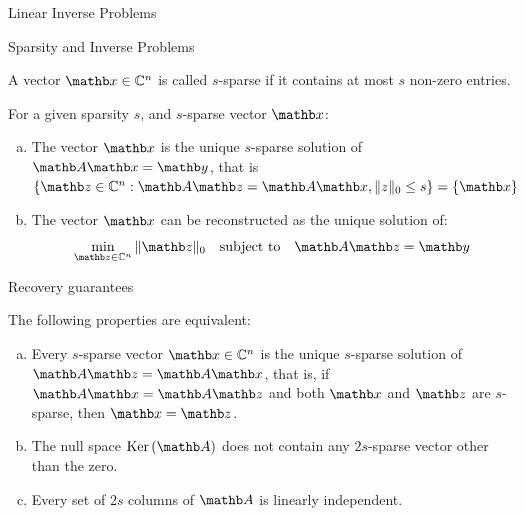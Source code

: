\begin{frame}{Linear Inverse Problems}

\end{frame}

\begin{frame}{Sparsity and Inverse Problems}
    \begin{definition}[Sparsity]
        A vector $\xb \in \mathbb{C}^n$ is called $s$-sparse if it contains at most $s$ non-zero entries.
    \end{definition}

    \begin{lemma}
        For a given sparsity $s$, and $s$-sparse vector $\xb$:
    \begin{enumerate}[(a)]
        \item The vector $\xb$ is the unique $s$-sparse solution of $\Ab \xb = \yb$, that is $\{\zb \in \mathbb{C}^n : \Ab \zb = \Ab \xb, \|z\|_0 \leq s\} = \{\xb\}$
        \item The vector $\xb$ can be reconstructed as the unique solution of:
        \begin{equation*}
            \label{eq:cs-problem-l0-min}
            \min_{\zb \in \mathbb{C}^n} \|\zb\|_0 \quad \text{subject to} \quad \Ab \zb = \yb
        \end{equation*}
    \end{enumerate}
    \end{lemma}
\end{frame}

\begin{frame}{Recovery guarantees}
    \begin{theorem}
        The following properties are equivalent:
\begin{enumerate}[(a)]
    \item Every $s$-sparse vector $\xb \in \mathbb{C}^n$ is the unique $s$-sparse solution of $\Ab \zb = \Ab \xb$, that is, if $\Ab \xb = \Ab \zb$ and both $\xb$ and $\zb$ are $s$-sparse, then $\xb = \zb$.
    \item The null space $\ker(\Ab)$ does not contain any $2s$-sparse vector other than the zero.
    \item Every set of $2s$ columns of $\Ab$ is linearly independent.
\end{enumerate}
    \end{theorem}
\end{frame}

